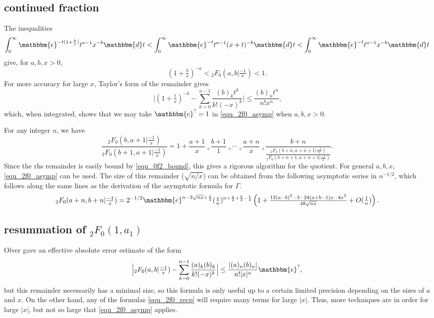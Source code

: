 \documentclass[12pt]{article}
\newcommand{\ee}[0] {\mathbbm{e}}
\newcommand{\dd}[0] {\mathbbm{d}}
\numberwithin{equation}{section}
\begin{document}
\subsection{continued fraction}
The inequalities
\begin{equation*}
\int_{0}^{\infty} \ee^{-t(1+\frac{b}{x})} t^{a-1}x^{-b} \dd t < \int_{0}^{\infty} \ee^{-t} t^{a-1}(x+t)^{-b} \dd t < \int_{0}^{\infty} \ee^{-t} t^{a-1}x^{-b} \dd t
\end{equation*}
give, for $a,b,x>0$,
\begin{equation}
\label{equ_0f2_bound}
(1+\tfrac{b}{x})^{-a} < {}_2 F_0(a,b|\tfrac{-1}{x}) < 1\text{.}
\end{equation}
For more accuracy for large $x$, Taylor's form of the remainder gives
\begin{equation*}
\Big| (1+\tfrac{t}{x})^{-b} - \sum_{k=0}^{n-1} \frac{(b)_k t^k}{ k! (-x)^k} \Big| \le \frac{(b)_n t^n}{ n!x^n} \text{,}
\end{equation*}
which, when integrated, shows that we may take $\ee^{?} = 1$ in \eqref{equ_2f0_asymp} when $a,b,x>0$.

For any integer $n$, we have
\begin{equation}
\label{equ_2f0_cf}
\frac{{}_2 F_0(b,a+1|\tfrac{-1}{x})}{{}_2 F_0(b+1,a+1|\tfrac{-1}{x})} = 1+\frac{a+1}{x} \,_{+} \frac{b+1}{1}  \,_{+} \cdots \,_{+} \frac{a+n}{x} \,_{+} \frac{b+n}{\frac{{}_2 F_0(b+n,a+n+1|\tfrac{-1}{x})}{{}_2 F_0(b+n+1,a+n+1|\tfrac{-1}{x})}}\text{.}
\end{equation}
Since the rhs remainder is easily bound by \eqref{equ_0f2_bound}, this gives a rigorous algorithm for the quotient. For general $a,b,x$, \eqref{equ_2f0_asymp} can be used. The size of this remainder ($\sqrt{n/x}$) can be obtained from the following asymptotic series in $n^{-1/2}$, which follows along the same lines as the derivation of the asymptotic formula for $\Gamma$.
\begin{equation*}
{}_2 F_0(a+n,b+n|\tfrac{-1}{x}) = 2^{-1/2} \ee^{n-2\sqrt{n x} + \frac{x}{2}} (\tfrac{x}{n})^{n+\frac{a}{2}+\frac{b}{2}-\frac{1}{4}} \left(1 + \tfrac{12(a-b)^2-3-24(a+b-1)x-4 x^2}{48\sqrt{n x}} + O(\tfrac{1}{n}) \right)\text{.}
\end{equation*}


\subsection{resummation of ${}_2 F_0(1,a_1)$}
Olver gave an effective absolute error estimate of the form
\begin{equation}
\label{equ_2f0_asymp}
\Big| {}_2 F_0(a,b|\tfrac{-1}{x}) - \sum_{k=0}^{n-1} \frac{(a)_k (b)_k}{ k! (-x)^k} \Big| \le \frac{|(a)_n (b)_n|}{ n! |x|^n} \ee^{?}\text{,}
\end{equation}
but this remainder necessarily has a minimal size, so this formula is only useful up to a certain limited precision depending on the sizes of $a$ and $x$. On the other hand, any of the formulas \eqref{equ_2f0_recp} will require many terms for large $|x|$. Thus, more techniques are in order for large $|x|$, but not so large that \eqref{equ_2f0_asymp} applies.
\end{document}

